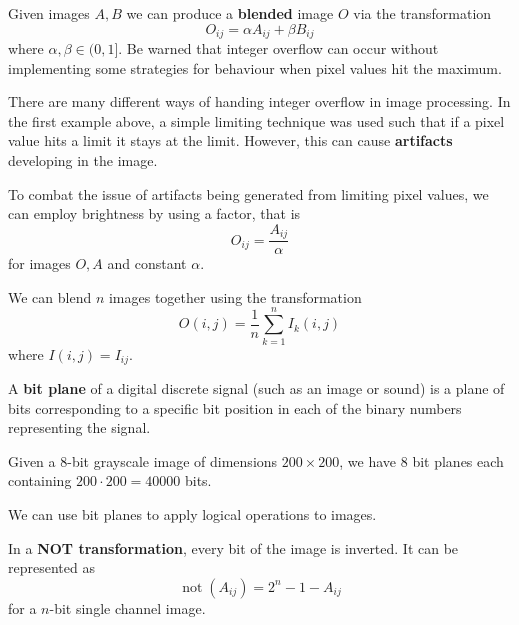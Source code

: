 \begin{example}[Blending]
    Given images $A, B$ we can produce a \textbf{blended} image $O$ via the transformation
    \[ O_{ij} = \alpha A_{ij} + \beta B_{ij} \]
    where $\alpha, \beta \in (0, 1]$. Be warned that integer overflow can occur without implementing some strategies for behaviour when pixel values hit the maximum.
\end{example}

There are many different ways of handing integer overflow in image processing. In the first example above, a simple limiting technique was used such that if a pixel value hits a limit it stays at the limit. However, this can cause \textbf{artifacts} developing in the image. 

\begin{example}
    To combat the issue of artifacts being generated from limiting pixel values, we can employ brightness by using a factor, that is
    \[ O_{ij} = \frac{A_{ij}}{\alpha} \]
    for images $O, A$ and constant $\alpha$.
\end{example}

\begin{example}
    We can blend $n$ images together using the transformation
    \[ O(i, j) = \frac{1}{n} \sum_{k = 1}^n I_k(i, j)\]
    where $I(i, j) = I_{ij}$.
\end{example}

\begin{definition}
    A \textbf{bit plane} of a digital discrete signal (such as an image or sound) is a plane of bits corresponding to a specific bit position in each of the binary numbers representing the signal.
\end{definition}

\begin{example}
    Given a $8$-bit grayscale image of dimensions $200 \times 200$, we have $8$ bit planes each containing $200 \cdot 200 = 40000$ bits.
\end{example}

We can use bit planes to apply logical operations to images.

\begin{definition}
    In a \textbf{NOT transformation}, every bit of the image is inverted. It can be represented as
    \[ \operatorname{not}{(A_{ij})} = 2^n - 1 - A_{ij} \]
    for a $n$-bit single channel image.
\end{definition}

